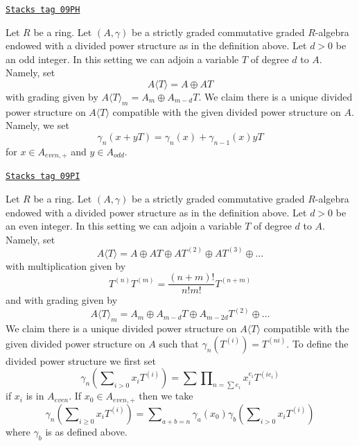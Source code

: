 \begin{example}

\label{dpa-example-adjoining-odd}
\href{https://stacks.math.columbia.edu/tag/09PH}{\texttt{Stacks tag 09PH}}

Let $R$ be a ring. Let $(A, \gamma)$ be a strictly graded commutative
graded $R$-algebra endowed with a divided power structure as in the
definition above. Let $d > 0$ be an odd integer.
In this setting we can adjoin a variable $T$ of degree $d$ to $A$.
Namely, set
$$
A\langle T \rangle = A \oplus AT
$$
with grading given by $A\langle T \rangle_m = A_m \oplus A_{m - d}T$.
We claim there is a unique divided power structure on
$A\langle T \rangle$ compatible with the given divided power
structure on $A$. Namely, we set
$$
\gamma_n(x + yT) = \gamma_n(x) + \gamma_{n - 1}(x)yT
$$
for $x \in A_{even, +}$ and $y \in A_{odd}$.
\end{example}

\begin{example}

\label{dpa-example-adjoining-even}
\href{https://stacks.math.columbia.edu/tag/09PI}{\texttt{Stacks tag 09PI}}

Let $R$ be a ring. Let $(A, \gamma)$ be a strictly graded commutative
graded $R$-algebra endowed with a divided power structure as in the
definition above. Let $d > 0$ be an even integer.
In this setting we can adjoin a variable $T$ of degree $d$ to $A$.
Namely, set
$$
A\langle T \rangle = A \oplus AT \oplus AT^{(2)} \oplus AT^{(3)} \oplus \ldots
$$
with multiplication given by
$$
T^{(n)} T^{(m)} = \frac{(n + m)!}{n!m!} T^{(n + m)}
$$
and with grading given by
$$
A\langle T \rangle_m =
A_m \oplus A_{m - d}T \oplus A_{m - 2d}T^{(2)} \oplus \ldots
$$
We claim there is a unique divided power structure on
$A\langle T \rangle$ compatible with the given divided power
structure on $A$ such that $\gamma_n(T^{(i)}) = T^{(ni)}$.
To define the divided power structure we first set
$$
\gamma_n\left(\sum\nolimits_{i > 0} x_i T^{(i)}\right) =
\sum \prod\nolimits_{n = \sum e_i} x_i^{e_i} T^{(ie_i)}
$$
if $x_i$ is in $A_{even}$. If $x_0 \in A_{even, +}$
then we take
$$
\gamma_n\left(\sum\nolimits_{i \geq 0} x_i T^{(i)}\right) =
\sum\nolimits_{a + b = n}
\gamma_a(x_0)\gamma_b\left(\sum\nolimits_{i > 0} x_iT^{(i)}\right)
$$
where $\gamma_b$ is as defined above.
\end{example}

